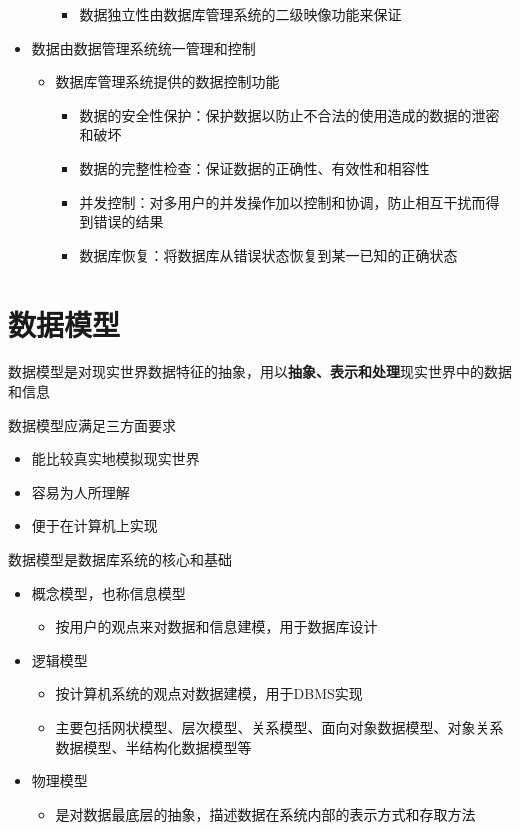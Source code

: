 \begin{itemize}
\begin{itemize}
\begin{itemize}
            \item 数据独立性由数据库管理系统的二级映像功能来保证
        \end{itemize}
    \end{itemize}
    \item 数据由数据管理系统统一管理和控制
    \begin{itemize}
        \item 数据库管理系统提供的数据控制功能
        \begin{itemize}
            \item 数据的安全性保护：保护数据以防止不合法的使用造成的数据的泄密和破坏
            \item 数据的完整性检查：保证数据的正确性、有效性和相容性
            \item 并发控制：对多用户的并发操作加以控制和协调，防止相互干扰而得到错误的结果
            \item 数据库恢复：将数据库从错误状态恢复到某一已知的正确状态
        \end{itemize}
    \end{itemize}
\end{itemize}

\section{数据模型}
数据模型是对现实世界数据特征的抽象，用以\textbf{抽象、表示和处理}现实世界中的数据和信息

数据模型应满足三方面要求
\begin{itemize}
    \item 能比较真实地模拟现实世界
    \item 容易为人所理解
    \item 便于在计算机上实现
\end{itemize}

数据模型是数据库系统的核心和基础
\begin{itemize}
    \item 概念模型，也称信息模型
    \begin{itemize}
        \item 按用户的观点来对数据和信息建模，用于数据库设计
    \end{itemize}
    \item 逻辑模型
    \begin{itemize}
        \item 按计算机系统的观点对数据建模，用于DBMS实现
        \item 主要包括网状模型、层次模型、关系模型、面向对象数据模型、对象关系数据模型、半结构化数据模型等
    \end{itemize}
    \item 物理模型
    \begin{itemize}
        \item 是对数据最底层的抽象，描述数据在系统内部的表示方式和存取方法
    \end{itemize}
\end{itemize}

